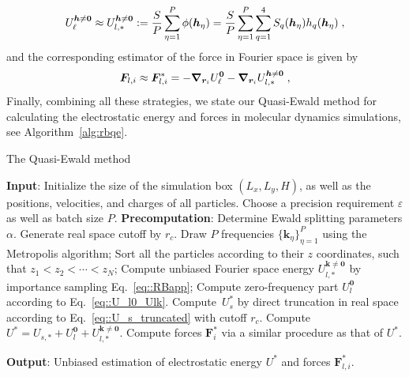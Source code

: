 \begin{equation}\label{eq::RBapp}
 U_\ell^{\boldsymbol{h}\neq \bm{0}} \approx U_{l,\ast}^{\boldsymbol{h}\neq \bm{0}}  :=   \frac{S}{P}\sum_{\eta=1}^P \phi(\boldsymbol{h}_{\eta})=  \frac{S}{P}\sum_{\eta=1}^P \sum_{q=1}^4S_q(\boldsymbol{h}_{\eta})h_q(\boldsymbol{h}_{\eta})\;,
\end{equation} 
and the corresponding estimator of the force in Fourier space is given by
\begin{equation}
	 \bm{F}_{l,i}\approx\bm{F}_{l,i}^*=-  \boldsymbol{\nabla}_{\boldsymbol{r}_i} U_\ell^{\bm{0}}- \boldsymbol{\nabla}_{\boldsymbol{r}_i} U_{l,\ast}^{\boldsymbol{h}\neq \bm{0}}\;,
 \end{equation}
Finally, combining all these strategies, we state our Quasi-Ewald method for calculating the electrostatic energy and forces in molecular dynamics simulations, see Algorithm~\ref{alg:rbqe}.
\begin{algorithm}[ht] 
\caption{The Quasi-Ewald method}
\begin{algorithmic}[1]
    \State \textbf{Input}:  Initialize the size of the simulation box $(L_x,L_y, H)$, as well as the positions, velocities, and charges of all particles. Choose a precision requirement $\varepsilon$ as well as batch size $P$.
    \State \textbf{Precomputation}:  Determine Ewald splitting parameters $\alpha$. Generate real space cutoff by $r_c$.
    \Procedure{}       
        \State Draw $P$ frequencies $\{\bm{k}_{\eta}\}_{\eta=1}^{P}$ using the Metropolis algorithm;
        \State Sort all the particles according to their $z$ coordinates, such that $z_1 < z_2 < \cdots < z_N$;
        \State Compute unbiased Fourier space energy $U_{l, *}^{\bm{k}\neq\bm{0}}$ by importance sampling Eq.~\eqref{eq::RBapp};
        \State Compute zero-frequency part $U_{l}^{\bm{0}}$ according to Eq.~\eqref{eq::U_l0_Ulk}.
        \State Compute~$U_{s}^{*}$ by direct truncation in real space according to Eq.~\eqref{eq::U_s_truncated} with cutoff $r_c$. %
        \State Compute $U^{*} = U_{s, *} + U_{l}^{\bm{0}} + U_{l, *}^{\bm{k}\neq\bm{0}}$.
        \State Compute forces $\bm{F}_{i}^{*}$ via a similar procedure as that of $U^{*}$.
    \EndProcedure

    \State \textbf{Output}: Unbiased estimation of electrostatic energy $U^{*}$ and forces $\bm{F}_{l,i}^{*}$.
\end{algorithmic}\label{alg:rbqe}
\end{algorithm}
